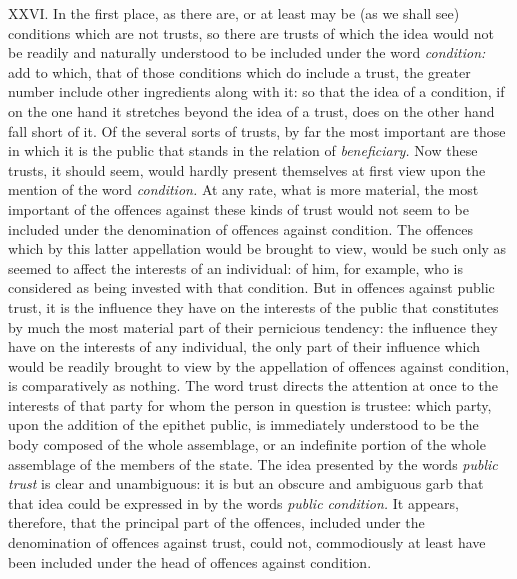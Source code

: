 \documentclass[12pt]{report}
\begin{document}
XXVI. In the first place, as there are, or at least may be (as we shall
see) conditions which are not trusts, so there are trusts of which the
idea would not be readily and naturally understood to be included under
the word \emph{condition:} add to which, that of those conditions which
do include a trust, the greater number include other ingredients along
with it: so that the idea of a condition, if on the one hand it
stretches beyond the idea of a trust, does on the other hand fall short
of it. Of the several sorts of trusts, by far the most important are
those in which it is the public that stands in the relation of
\emph{beneficiary.} Now these trusts, it should seem, would hardly
present themselves at first view upon the mention of the word
\emph{condition.} At any rate, what is more material, the most important
of the offences against these kinds of trust would not seem to be
included under the denomination of offences against condition. The
offences which by this latter appellation would be brought to view,
would be such only as seemed to affect the interests of an individual:
of him, for example, who is considered as being invested with that
condition. But in offences against public trust, it is the influence
they have on the interests of the public that constitutes by much the
most material part of their pernicious tendency: the influence they have
on the interests of any individual, the only part of their influence
which would be readily brought to view by the appellation of offences
against condition, is comparatively as nothing. The word trust directs
the attention at once to the interests of that party for whom the person
in question is trustee: which party, upon the addition of the epithet
public, is immediately understood to be the body composed of the whole
assemblage, or an indefinite portion of the whole assemblage of the
members of the state. The idea presented by the words \emph{public
trust} is clear and unambiguous: it is but an obscure and ambiguous garb
that that idea could be expressed in by the words \emph{public
condition.} It appears, therefore, that the principal part of the
offences, included under the denomination of offences against trust,
could not, commodiously at least have been included under the head of
offences against condition.
\end{document}
